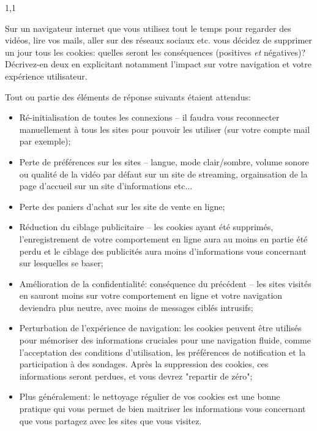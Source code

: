 \documentclass[11pt,a4paper]{exam}
\begin{document}
\begin{spacing}{1,1}
\begin{questions}
        	\question[2] Sur un navigateur internet que vous utilisez tout le temps pour regarder des vidéos, lire vos mails, aller sur des réseaux sociaux etc. vous décidez de supprimer un jour tous les cookies: quelles seront les conséquences (positives \textit{et} négatives)? Décrivez-en deux en explicitant notamment l'impact sur votre navigation et votre expérience utilisateur.
			\begin{solution}
        		Tout ou partie des éléments de réponse suivants étaient attendus:
        		\begin{itemize}
        			\item Ré-initialisation de toutes les connexions -- il faudra vous reconnecter manuellement à tous les sites pour pouvoir les utiliser (sur votre compte mail par exemple);
        			\item Perte de préférences sur les sites -- langue, mode clair/sombre, volume sonore ou qualité de la vidéo par défaut sur un site de streaming, orgainsation de la page d'accueil sur un site d'informations etc...
        			\item Perte des paniers d'achat sur les site de vente en ligne;
        			\item Réduction du ciblage publicitaire -- les cookies ayant été supprimés, l'enregistrement de votre comportement en ligne aura au moins en partie été perdu et le ciblage des publicités aura moins d'informations vous concernant sur lesquelles se baser;
        			\item Amélioration de la confidentialité: conséquence du précédent -- les sites visités en sauront moins sur votre comportement en ligne et votre navigation deviendra plus neutre, avec moins de messages ciblés intrusifs;
        			\item Perturbation de l'expérience de navigation: les cookies peuvent être utilisés pour mémoriser des informations cruciales pour une navigation fluide, comme l'acceptation des conditions d'utilisation, les préférences de notification et la participation à des sondages. Après la suppression des cookies, ces informations seront perdues, et  vous devrez "repartir de zéro";
        			\item Plus généralement: le nettoyage régulier de vos cookies est une bonne pratique qui vous permet de bien maitriser les informations vous concernant que vous partagez avec les sites que vous visitez.
        		\end{itemize}
        	\end{solution}
        	

\end{questions}
\end{spacing}
\end{document}
